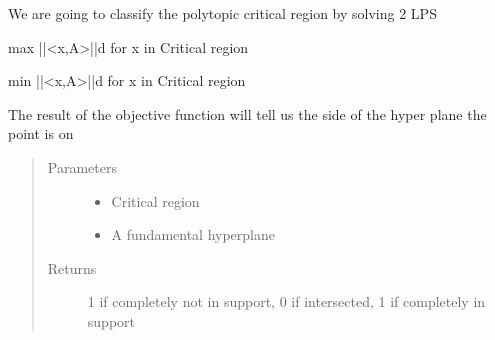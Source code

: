 \documentclass[letterpaper,10pt,english]{sphinxmanual}
\begin{document}

\begin{fulllineitems}
\label{\detokenize{mpo.upop:mpo.upop.ucontroller.classify_polytope}}
\sphinxAtStartPar
We are going to classify the polytopic critical region by solving 2 LPS

\sphinxAtStartPar
max ||\textless{}x,A\textgreater{}||\sphinxhyphen{}d for x in Critical region

\sphinxAtStartPar
min ||\textless{}x,A\textgreater{}||\sphinxhyphen{}d for x in Critical region

\sphinxAtStartPar
The result of the objective function will tell us the side of the hyper plane the point is on
\begin{quote}\begin{description}
\item[{Parameters}] \leavevmode\begin{itemize}
\item {} 
\sphinxAtStartPar
{} \textendash{} Critical region

\item {} 
\sphinxAtStartPar
{} \textendash{} A fundamental hyperplane

\end{itemize}

\item[{Returns}] \leavevmode
\sphinxAtStartPar
\sphinxhyphen{}1 if completely not in support, 0 if intersected, 1 if completely in support

\end{description}\end{quote}

\end{fulllineitems}

\end{document}
